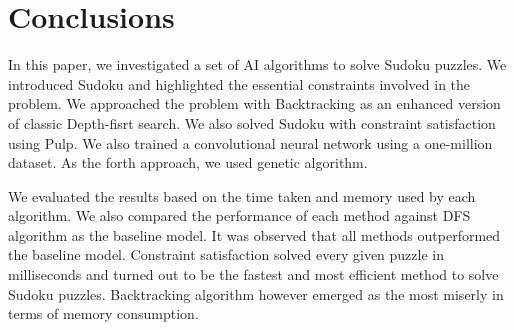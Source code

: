 \section{Conclusions}
In this paper, we investigated a set of AI algorithms to solve Sudoku puzzles. We introduced Sudoku and highlighted the essential constraints involved in the problem.  
We approached the problem with Backtracking as an enhanced version of classic Depth-fisrt search. We also solved Sudoku with constraint satisfaction using Pulp. We also trained a convolutional neural network using a one-million dataset. As the forth approach, we used genetic algorithm. 

We evaluated the results based on the time taken and memory used by each algorithm. We also compared the performance of each method against DFS algorithm as the baseline model. It was observed that all methods outperformed the baseline model. Constraint satisfaction solved every given puzzle in milliseconds and turned out to be the fastest and most efficient method to solve Sudoku puzzles. Backtracking algorithm however emerged as the most miserly in terms of memory consumption.

